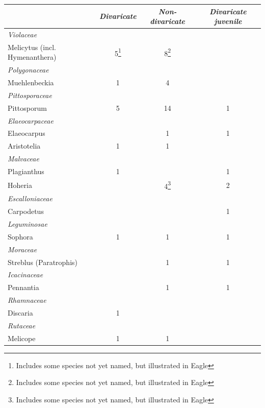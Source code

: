 \begin{xltabular}{\textwidth}{ X c c c }
	\toprule
	& \emph{Divaricate} & \emph{Non-divaricate} & \emph{Divaricate juvenile}\\
	\midrule
	\endhead%
	\emph{Violaceae} \\
	\hspace{3mm}Melicytus (incl.
Hymenanthera)
	& 5\footnote{Includes some species not yet named, but illustrated in Eagle}
	& 8\footnote{Includes some species not yet named, but illustrated in Eagle} \\
	\emph{Polygonaceae} \\
	\hspace{3mm}Muehlenbeckia & 1 & 4 \\
	\emph{Pittosporaceae} \\
	\hspace{3mm}Pittosporum & 5 & 14 & 1\\
	\emph{Elaeocarpaceae} \\
	\hspace{3mm}Elaeocarpus &  & 1 & 1\\
	\hspace{3mm}Aristotelia & 1 & 1 \\
	\emph{Malvaceae} \\
	\hspace{3mm}Plagianthus & 1 & & 1\\
	\hspace{3mm}Hoheria & 
	& 4\footnote{Includes some species not yet named, but illustrated in Eagle}
	& 2\\
	\emph{Escalloniaceae} \\
	\hspace{3mm}Carpodetus &  &  & 1\\
	\emph{Leguminosae} \\
	\hspace{3mm}Sophora & 1 & 1 & 1\\
	\emph{Moraceae} \\
	\hspace{3mm}Streblus (Paratrophis) &  & 1 & 1\\
	\emph{Icacinaceae} \\
	\hspace{3mm}Pennantia &  & 1 & 1\\
	\emph{Rhamnaceae} \\
	\hspace{3mm}Discaria & 1 \\
	\emph{Rutaceae} \\
	\hspace{3mm}Melicope & 1 & 1 \\

\end{xltabular}
